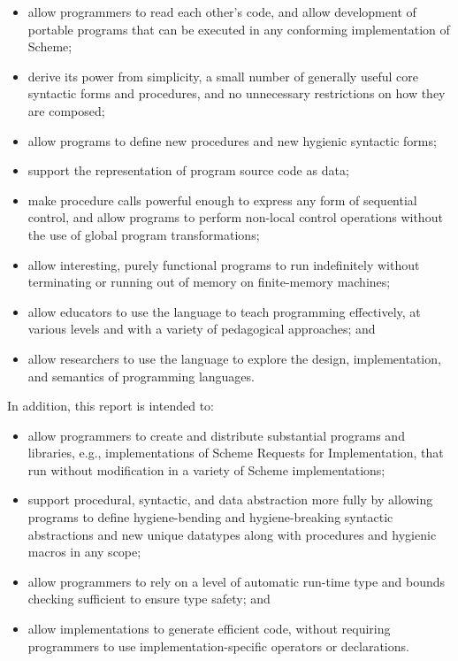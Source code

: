 \begin{itemize}
\item allow programmers to read each other's code, and allow
  development of portable programs that can be executed in any
  conforming implementation of Scheme;

\item derive its power from simplicity, a small number of generally
  useful core syntactic forms and procedures, and no unnecessary
  restrictions on how they are composed;

\item allow programs to define new procedures and new hygienic
  syntactic forms;

\item support the representation of program source code as data;

\item make procedure calls powerful enough to express any form of
  sequential control, and allow programs to perform non-local control
  operations without the use of global program transformations;

\item allow interesting, purely functional programs to run indefinitely
  without terminating or running out of memory on finite-memory
  machines;

\item allow educators to use the language to teach programming
  effectively, at various levels and with a variety of pedagogical
  approaches; and

\item allow researchers to use the language to explore the design,
  implementation, and semantics of programming languages.
\end{itemize}

In addition, this report is intended to:

\begin{itemize}
\item allow programmers to create and distribute substantial programs
  and libraries, e.g., implementations of Scheme Requests for
  Implementation, that run without
  modification in a variety of Scheme implementations;

\item support procedural, syntactic, and data abstraction more fully
  by allowing programs to define hygiene-bending and hygiene-breaking
  syntactic abstractions and new unique datatypes along with
  procedures and hygienic macros in any scope;

\item allow programmers to rely on a level of automatic run-time type
  and bounds checking sufficient to ensure type safety; and

\item allow implementations to generate efficient code, without
  requiring programmers to use implementation-specific operators or
  declarations.
\end{itemize}

